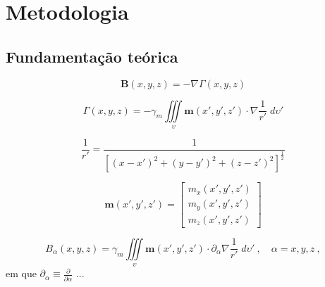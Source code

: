 \chapter{Metodologia}
\label{chap:metodologia}


\section{Fundamentação teórica}
\label{sec:fundamentacao}

\begin{equation}
\mathbf{B}(x, y, z) = - \nabla \Gamma(x, y, z)
\label{eq:B-true-generic}
\end{equation}

\begin{equation}
\Gamma(x, y, z) = - \gamma_{m} \iiint\limits_{\upsilon} \mathbf{m}(x', y', z') \cdot \nabla\frac{1}{r'} 
\; d\upsilon'
\label{eq:Gamma-potential}
\end{equation}

\begin{equation}
\frac{1}{r'} = \frac{1}{\left[ (x - x')^{2} + (y - y')^{2} + (z - z')^{2} \right]^{\frac{1}{2}}}
\label{eq:inv-r'}
\end{equation}

\begin{equation}
\mathbf{m}(x', y', z') = \begin{bmatrix}
m_{x}(x', y', z') \\
m_{y}(x', y', z') \\
m_{z}(x', y', z')
\end{bmatrix}
\label{eq:mag-vector-true-generic}
\end{equation}

\begin{equation}
B_{\alpha}(x, y, z) = \gamma_{m} \iiint\limits_{\upsilon} 
\mathbf{m}(x', y', z') \cdot \partial_{\alpha} \nabla \frac{1}{r'} 
\; d\upsilon' \: , \quad \alpha = x, y, z \: ,
\label{eq:B-alpha-true-generic}
\end{equation}
em que $\partial_{\alpha} \equiv \frac{\partial}{\partial \alpha}$ ...

